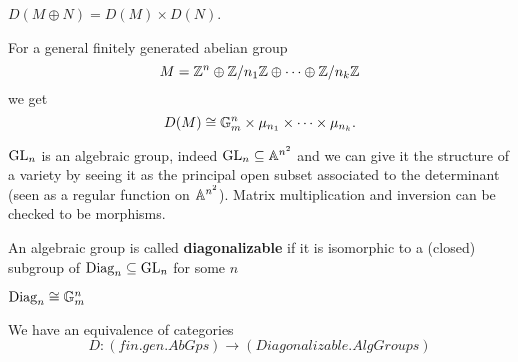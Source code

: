 \begin{exercise}
$D(M\oplus N)=D(M)\times D(N)$.
\end{exercise}

For a general finitely generated abelian group
\[M=\mathbb{Z}^n\oplus {\mathbb{Z}/{n_1}\mathbb{Z}}\oplus\cdots\oplus {\mathbb{Z}/{n_k}\mathbb{Z}}\]
we get
\[D(M)\cong \mathbb{G}_m^n\times\mu_{n_1}\times\cdots\times\mu_{n_k}.\]


\begin{remark}
$\mathrm{GL}_n$ is an algebraic group, indeed $\mathrm{GL}_n\subseteq \mathbb{A}^{n^2}$ and we can give it the structure of a variety by seeing it as the principal open subset associated to the determinant (seen as a regular function on $\mathbb{A}^{n^2}$). Matrix multiplication and inversion can be checked to be morphisms.
\end{remark}

\begin{definition}
An algebraic group is called \textbf{diagonalizable} if it is isomorphic to a (closed) subgroup of $\mathrm{Diag}_n\subseteq \mathrm{GL}_n$ for some $n$
\end{definition}

\begin{remark}
$\mathrm{Diag}_n\cong\mathbb{G}_m^n$
\end{remark}

\begin{fact}
We have an equivalence of categories
\[D:(fin.gen.AbGps)\to (Diagonalizable.AlgGroups)\]
\end{fact}



